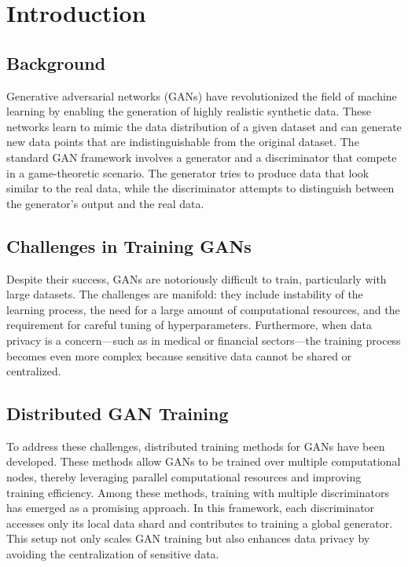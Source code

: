 \chapter{Introduction}

\section{Background}
Generative adversarial networks (GANs) have revolutionized the field of machine learning by enabling the generation of highly realistic synthetic data. These networks learn to mimic the data distribution of a given dataset and can generate new data points that are indistinguishable from the original dataset. The standard GAN framework involves a generator and a discriminator that compete in a game-theoretic scenario. The generator tries to produce data that look similar to the real data, while the discriminator attempts to distinguish between the generator's output and the real data.

\section{Challenges in Training GANs}
Despite their success, GANs are notoriously difficult to train, particularly with large datasets. The challenges are manifold: they include instability of the learning process, the need for a large amount of computational resources, and the requirement for careful tuning of hyperparameters. Furthermore, when data privacy is a concern—such as in medical or financial sectors—the training process becomes even more complex because sensitive data cannot be shared or centralized.

\section{Distributed GAN Training}
To address these challenges, distributed training methods for GANs have been developed. These methods allow GANs to be trained over multiple computational nodes, thereby leveraging parallel computational resources and improving training efficiency. Among these methods, training with multiple discriminators has emerged as a promising approach. In this framework, each discriminator accesses only its local data shard and contributes to training a global generator. This setup not only scales GAN training but also enhances data privacy by avoiding the centralization of sensitive data.

